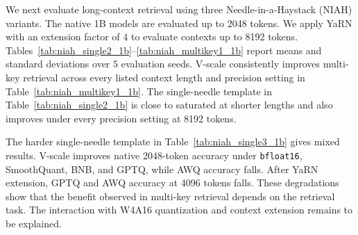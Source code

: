\documentclass{article}
\theoremstyle{plain}
\theoremstyle{definition}
\theoremstyle{remark}
\begin{document}
We next evaluate long-context retrieval using three Needle-in-a-Haystack (NIAH) variants. The native 1B models are evaluated up to 2048 tokens. We apply YaRN with an extension factor of $4$ to evaluate contexts up to 8192 tokens. Tables~\ref{tab:niah_single2_1b}--\ref{tab:niah_multikey1_1b} report means and standard deviations over $5$ evaluation seeds. V-scale consistently improves multi-key retrieval across every listed context length and precision setting in Table~\ref{tab:niah_multikey1_1b}. The single-needle template in Table~\ref{tab:niah_single2_1b} is close to saturated at shorter lengths and also improves under every precision setting at 8192 tokens.

The harder single-needle template in Table~\ref{tab:niah_single3_1b} gives mixed results. V-scale improves native 2048-token accuracy under \texttt{bfloat16}, SmoothQuant, BNB, and GPTQ, while AWQ accuracy falls. After YaRN extension, GPTQ and AWQ accuracy at 4096 tokens falls. These degradations show that the benefit observed in multi-key retrieval depends on the retrieval task. The interaction with W4A16 quantization and context extension remains to be explained.
\end{document}
